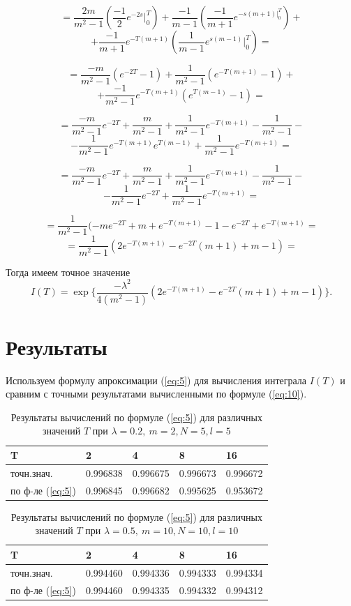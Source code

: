 \documentclass [a4paper, 12pt]{report}
\begin{document}
$$
= \frac{2m}{m^2-1} (\frac{-1}{2} e^{-2s} \Big|_{0}^{T}) +
\frac{-1}{m-1}( \frac{-1}{m+1} e^{-s(m+1) \Big|_{0}^{T}}) +
$$
$$
+ \frac{-1}{m+1} e^{-T(m+1)} (\frac{1}{m-1} e^{s(m-1)} \Big|_{0}^{T}) =
$$

$$
= \frac{-m}{m^2-1} (e^{-2T} - 1) +
\frac{1}{m^2-1} ( e^{-T(m+1)} - 1) +
$$
$$
+ \frac{-1}{m^2-1} e^{-T(m+1)} (e^{T(m-1)} - 1) =
$$

$$
= \frac{-m}{m^2-1} e^{-2T} + \frac{m}{m^2-1} +
\frac{1}{m^2-1} e^{-T(m+1)} - \frac{1}{m^2-1} -
$$
$$
- \frac{1}{m^2-1} e^{-T(m+1)} e^{T(m-1)} + \frac{1}{m^2-1} e^{-T(m+1)} =
$$

$$
= \frac{-m}{m^2-1} e^{-2T} + \frac{m}{m^2-1} +
\frac{1}{m^2-1} e^{-T(m+1)} - \frac{1}{m^2-1} -
$$
$$
- \frac{1}{m^2-1} e^{-2T} + \frac{1}{m^2-1} e^{-T(m+1)} =
$$

$$
= \frac{1}{m^2-1}( -m e^{-2T} + m +
e^{-T(m+1)} - 1 - e^{-2T} + e^{-T(m+1)} =
$$
$$
= \frac{1}{m^2-1}( 2e^{-T(m+1)} - e^{-2T} (m + 1) + m - 1) =
$$

\noindent Тогда имеем точное значение
\begin{equation} \label{eq:10}
I(T) = \exp\{ \frac{- \lambda^2}{4(m^2-1)}
( 2e^{-T(m+1)} - e^{-2T} (m + 1) + m - 1) \}.
\end{equation}

\section{Результаты}
\qquad

Используем формулу апроксимации (\ref{eq:5}) для вычисления интеграла $I(T)$ и сравним с точными результатами вычисленными по формуле (\ref{eq:10}).

\begin{table}
\caption{Результаты вычислений по формуле (\ref{eq:5}) для
различных значений $T$ при $\lambda=0.2,~m=2, N=5, l=5$}
\begin{center}
\begin{tabular}{ | m{3cm} | m{2cm}| m{2cm} | m{2cm} | m{2cm} | }
\hline
 T & 2 & 4 & 8 & 16 \\
\hline
 точн.знач. & 0.996838 & 0.996675 & 0.996673 & 0.996672 \\
 по ф-ле (\ref{eq:5}) & 0.996845 & 0.996682 & 0.995625 & 0.953672 \\
\hline
\end{tabular}
\end{center}
\end{table}

\begin{table}
\caption{Результаты вычислений по формуле (\ref{eq:5}) для
различных значений $T$ при $\lambda=0.5,~m=10, N=10, l=10$}
\begin{center}
\begin{tabular}{ | m{3cm} | m{2cm}| m{2cm} | m{2cm} | m{2cm} | }
\hline
 T & 2 & 4 & 8 & 16 \\
\hline
 точн.знач. & 0.994460 & 0.994336 & 0.994333 & 0.994334 \\
 по ф-ле (\ref{eq:5}) & 0.994460 & 0.994335 & 0.994332 & 0.994312 \\
\hline
\end{tabular}
\end{center}
\end{table}
\end{document}
